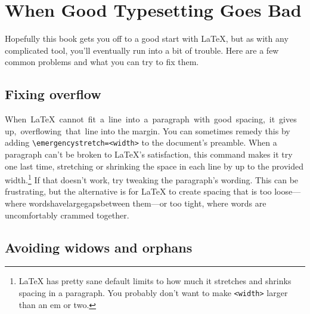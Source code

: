 \chapter{When Good Typesetting Goes Bad}

Hopefully this book gets you off to a good start with \LaTeX,
but as with any complicated tool, you'll eventually run into a bit of trouble.
Here are a few common problems and what you can try to fix them.

\section{Fixing overflow}

\mbox{When \LaTeX{} cannot fit a line into a paragraph with good spacing,
it gives up, overflowing that line}
into the margin.
You can sometimes remedy this by adding
\verb|\emergencystretch=<width>| to the document's preamble.
When a paragraph can't be broken to \LaTeX's satisfaction,
this command makes it try one last time,
stretching or shrinking the space in each line by up to the provided
width.\punckern\footnote{\LaTeX{} has pretty sane default limits to how much
it stretches and shrinks spacing in a paragraph.
You probably don't want to make \texttt{<width>} larger than an em or two.}
If that doesn't work, try tweaking the paragraph's wording.
This can be frustrating, but the alternative is for \LaTeX{} to create spacing
that is too loose---where\enspace
words\enspace have\enspace large\quad gaps\enspace between\enspace
them---or too tight, where\! words\! are\! uncomfortably\! crammed\! together.

\section{Avoiding widows and orphans}

